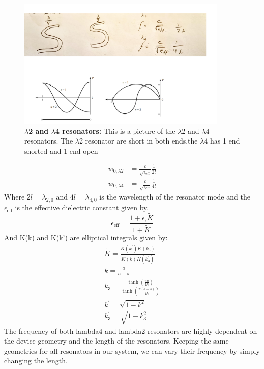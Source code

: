     \begin{figure}
        \centering
            \includegraphics[width=10cm]{Images/lambda2 and lambda4 resonators_total.png}
            \caption[$\lambda$2 and $\lambda$4 resonators]{\textbf{$\lambda$2 and $\lambda$4 resonators:} This is a picture of the $\lambda$2 and $\lambda$4 resonators. The $\lambda$2 resonator are short in both ends.the $\lambda$4 has 1 end shorted and 1 end open}
        \label{fig:lambda2_and_lambda4}
    \end{figure}
    \begin{equation}
        \begin{aligned}
            w_{0,\lambda 2} &= \frac{c}{\sqrt{\epsilon_{\mathrm{eff}}}} \frac{1}{2 l} \\
            w_{0,\lambda 4} &= \frac{c}{\sqrt{\epsilon_{\mathrm{eff}}}} \frac{1}{4 l}
        \end{aligned}
    \end{equation}
    Where $2l = \lambda_{2,0}$ and $4l = \lambda_{4,0}$ is the wavelength of the resonator mode and the $\epsilon_{\mathrm{eff}}$ is the effective dielectric constant given by. 
    \begin{equation}
        \epsilon_{\mathrm{eff}}=\frac{1+\epsilon_{\mathrm{r}} \widetilde{K}}{1+\widetilde{K}}
    \end{equation}
    And K(k) and K(k') are elliptical integrals given by: 
    \begin{equation}
        \begin{gathered}
            \widetilde{K}=\frac{K\left(k^{\prime}\right) K\left(k_3\right)}{K(k) K\left(k_3^{\prime}\right)} \\
            k=\frac{a}{a+s} \\
            k_3=\frac{\tanh \left(\frac{\pi a}{4 h}\right)}{\tanh \left(\frac{\pi (a+s)}{4 h}\right)} \\
            k^{\prime}=\sqrt{1-k^2} \\
            k_3^{\prime}=\sqrt{1-k_3^2}
            \end{gathered}
    \end{equation}
	The frequency of both lambda4 and lambda2 resonators are highly dependent on the device geometry and the length of the resonators. Keeping the same geometries for all resonators in our system, we can vary their frequency by simply changing the length. 
    
